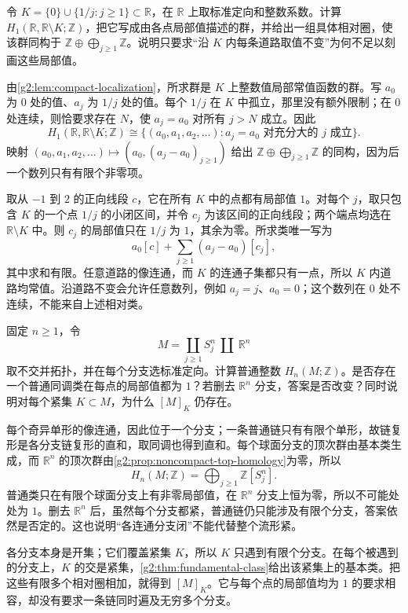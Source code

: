 \begin{exercise}\label{g2:ex:convergent-compact-local-classes}
	令 \(K=\{0\}\cup\{1/j:j\geq1\}\subset\mathbb R\)，在 \(\mathbb R\) 上取标准定向和整数系数。计算 \(H_1(\mathbb R,\mathbb R\setminus K;\mathbb Z)\)，把它写成由各点局部值描述的群，并给出一组具体相对圈，使该群同构于 \(\mathbb Z\oplus\bigoplus_{j\geq1}\mathbb Z\)。说明只要求“沿 \(K\) 内每条道路取值不变”为何不足以刻画这些局部值。
\end{exercise}
\begin{solution}
	由\cref{g2:lem:compact-localization}，所求群是 \(K\) 上整数值局部常值函数的群。写 \(a_0\) 为 \(0\) 处的值、\(a_j\) 为 \(1/j\) 处的值。每个 \(1/j\) 在 \(K\) 中孤立，那里没有额外限制；在 \(0\) 处连续，则恰要求存在 \(N\)，使 \(a_j=a_0\) 对所有 \(j>N\) 成立。因此
	\[
		H_1(\mathbb R,\mathbb R\setminus K;\mathbb Z)
		\cong\{(a_0,a_1,a_2,\ldots):a_j=a_0\text{ 对充分大的 }j\text{ 成立}\}.
	\]
	映射 \((a_0,a_1,a_2,\ldots)\mapsto(a_0,(a_j-a_0)_{j\geq1})\) 给出 \(\mathbb Z\oplus\bigoplus_{j\geq1}\mathbb Z\) 的同构，因为后一个数列只有有限个非零项。

	取从 \(-1\) 到 \(2\) 的正向线段 \(c\)，它在所有 \(K\) 中的点都有局部值 \(1\)。对每个 \(j\)，取只包含 \(K\) 的一个点 \(1/j\) 的小闭区间，并令 \(c_j\) 为该区间的正向线段；两个端点均选在 \(\mathbb R\setminus K\) 中。则 \(c_j\) 的局部值只在 \(1/j\) 为 \(1\)，其余为零。所求类唯一写为
	\[
		a_0[c]+\sum_{j\geq1}(a_j-a_0)[c_j],
	\]
	其中求和有限。任意道路的像连通，而 \(K\) 的连通子集都只有一点，所以 \(K\) 内道路均常值。沿道路不变会允许任意数列，例如 \(a_j=j\)、\(a_0=0\)；这个数列在 \(0\) 处不连续，不能来自上述相对类。
\end{solution}

\begin{exercise}\label{g2:ex:disconnected-top-classes}
	固定 \(n\geq1\)，令
	\[
		M=\coprod_{j\geq1}S^n_j\ \amalg\ \mathbb R^n
	\]
	取不交并拓扑，并在每个分支选标准定向。计算普通整数 \(H_n(M;\mathbb Z)\)。是否存在一个普通同调类在每点的局部值都为 \(1\)？若删去 \(\mathbb R^n\) 分支，答案是否改变？同时说明对每个紧集 \(K\subset M\)，为什么 \([M]_K\) 仍存在。
\end{exercise}
\begin{solution}
	每个奇异单形的像连通，因此位于一个分支；一条普通链只有有限个单形，故链复形是各分支链复形的直和，取同调也得到直和。每个球面分支的顶次群由基本类生成，而 \(\mathbb R^n\) 的顶次群由\cref{g2:prop:noncompact-top-homology}为零，所以
	\[
		H_n(M;\mathbb Z)=\bigoplus_{j\geq1}\mathbb Z[S^n_j].
	\]
	普通类只在有限个球面分支上有非零局部值，在 \(\mathbb R^n\) 分支上恒为零，所以不可能处处为 \(1\)。删去 \(\mathbb R^n\) 后，虽然每个分支都紧，普通链仍只能涉及有限个分支，答案依然是否定的。这也说明“各连通分支闭”不能代替整个流形紧。

	各分支本身是开集；它们覆盖紧集 \(K\)，所以 \(K\) 只遇到有限个分支。在每个被遇到的分支上，\(K\) 的交是紧集，\cref{g2:thm:fundamental-class}给出该紧集上的基本类。把这些有限多个相对圈相加，就得到 \([M]_K\)。它与每个点的局部值均为 \(1\) 的要求相容，却没有要求一条链同时遍及无穷多个分支。
\end{solution}

